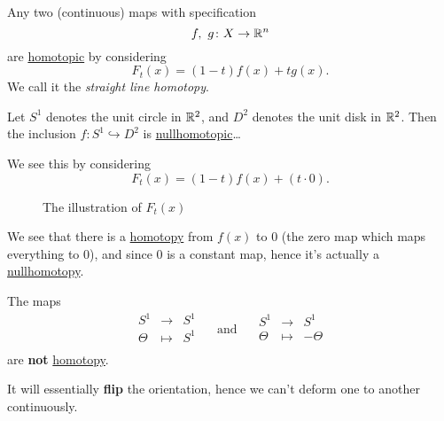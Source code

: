 \begin{eg}\label{eg:lec1:straight-line-homotopy}
	Any two (continuous) maps with specification
	\[
		f,\ g\colon X\to \mathbb{\MakeUppercase{R}}^n
	\]
	are \hyperref[def:homotopic]{homotopic} by considering
	\[
		F_{t}(x) = (1 - t)f(x) + t g(x).
	\]
	We call it the \emph{straight line homotopy}.
\end{eg}
\begin{eg}
	Let \(S^1\) denotes the unit circle in \(\mathbb{\MakeUppercase{R}} ^2\), and
	\(D^2\)  denotes the unit disk in \(\mathbb{\MakeUppercase{R}} ^2\). Then the inclusion
	\(f\colon S^1\hookrightarrow D^2\) is \hyperref[def:nullhomotopic]{nullhomotopic}\dots
\end{eg}
\begin{explanation}
	We see this by considering
	\[
		F_t(x) = (1 - t)f(x) + (t\cdot 0).
	\]
	\begin{figure}[H]
		\centering
		\caption{The illustration of \(F_{t}(x)\)}
		\label{fig:eg:homotopy}
	\end{figure}
	We see that there is a \hyperref[def:homotopy]{homotopy} from \(f(x)\) to \(0\) (the zero
	map which maps everything to \(0\)), and since \(0\) is a constant map, hence it's actually
	a \hyperref[def:nullhomotopic]{nullhomotopy}.
\end{explanation}
\begin{eg}
	The maps
	\[
		\begin{array}{ccc}
			S^1    & \to     & S^1 \\
			\Theta & \mapsto & S^1 \\
		\end{array}\quad \text{ and } \quad
		\begin{array}{ccc}
			S^1    & \to     & S^1     \\
			\Theta & \mapsto & -\Theta \\
		\end{array}
	\]
	are \textbf{not} \hyperref[def:homotopy]{homotopy}.
	\begin{remark}
		It will essentially \textbf{flip} the orientation, hence we can't deform one to another continuously.
	\end{remark}
\end{eg}

